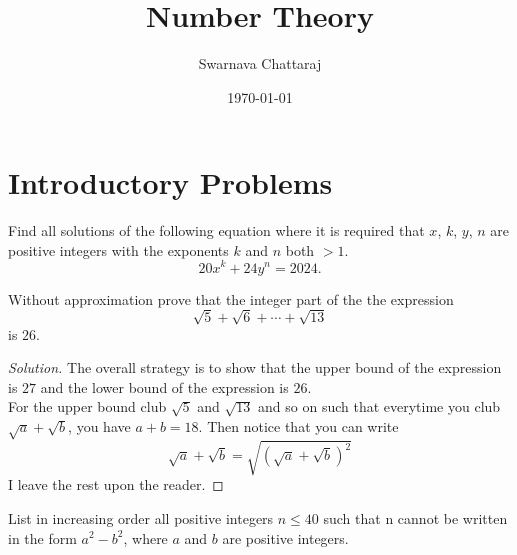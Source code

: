 \documentclass{scrartcl} %
\title{Number Theory}
\author{Swarnava Chattaraj}
\date{\today}
\begin{document}
\maketitle

\section{Introductory Problems} %


\begin{example}
   Find all solutions of the following equation where it is required that
$x$, $k$, $y$, $n$ are positive integers with the exponents $k$ and $n$ both $> 1$.
\[20x^k + 24y^n = 2024.\]
\end{example}

\begin{example}
Without approximation prove that the integer part of the the expression 
\[
	\sqrt{5} + \sqrt{6} + \cdots + \sqrt{13}
\]
is $26$.
\end{example}
\begin{proof}[Solution]
	The overall strategy is to show that the upper bound of the expression is $27$ and the lower bound of the expression is $26$.\\
	For the upper bound club $\sqrt{5}$ and $\sqrt{13}$ and so on such that everytime you club $\sqrt{a} + \sqrt{b}$, you have $a + b = 18$. Then notice that you can write \[
		\sqrt{a} + \sqrt{b} = \sqrt{\left(\sqrt{a}+\sqrt{b}\right)^2}
	\]
	I leave the rest upon the reader.
\end{proof}
\newpage
\begin{example}[CMI A5, 2018]
	List in increasing order all positive integers $n \leq 40$ such that n cannot be written in the form $a^2 - b^2$, where $a$ and $b$ are positive integers.

\end{example}
\end{document}
